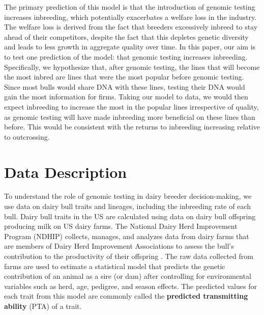 \documentclass[12pt,letterpaper]{article}
\begin{document}
The primary prediction of this model is that the introduction of genomic testing increases inbreeding, which potentially exacerbates a welfare loss in the industry.
The welfare loss is derived from the fact that breeders excessively inbreed to stay ahead of their competitors, despite the fact that this depletes genetic diversity and leads to less growth in aggregate quality over time.
In this paper, our aim is to test one prediction of the model: that genomic testing increases inbreeding.
Specifically, we hypothesize that, after genomic testing, the lines that will become the most inbred are lines that were the most popular before genomic testing.
Since most bulls would share DNA with these lines, testing their DNA would gain the most information for firms.
Taking our model to data, we would then expect inbreeding to increase the most in the popular lines irrespective of quality, as genomic testing will have made inbreeding more beneficial on these lines than before.
This would be consistent with the returns to inbreeding increasing relative to outcrossing.

\section{Data Description\label{sec:data_description}}
To understand the role of genomic testing in dairy breeder decision-making, we use data on dairy bull traits and lineages, including the inbreeding rate of each bull.
Dairy bull traits in the US are calculated using data on dairy bull offspring producing milk on US dairy farms. The National Dairy Herd Improvement Program (NDHIP) collects, manages, and analyzes data from dairy farms that are members of Dairy Herd Improvement Associations to assess the bull's contribution to the productivity of their offspring \citep{Hutchins_Hueth2023}. The raw data collected from farms are used to estimate a statistical model that predicts the genetic contribution of an animal as a sire (or dam) after controlling for environmental variables such as herd, age, pedigree, and season effects. The predicted values for each trait from this model are commonly called the \textbf{predicted transmitting ability} (PTA) of a trait.
\end{document}
